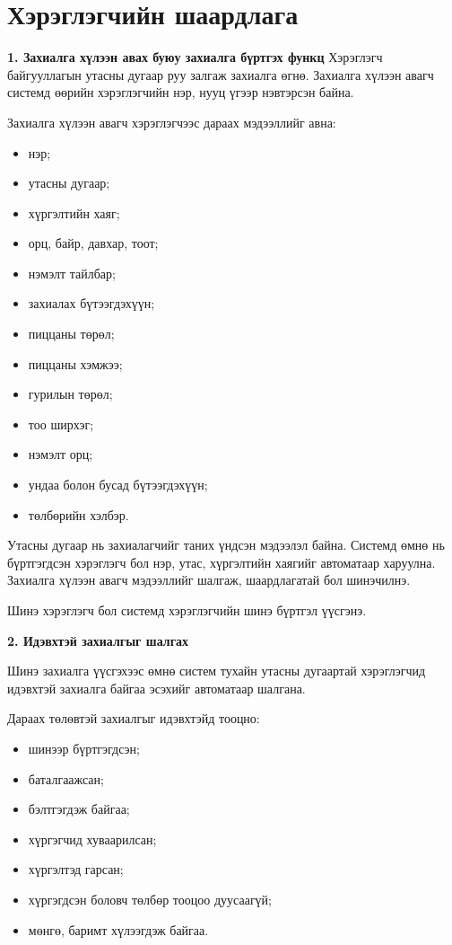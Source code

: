 \section{Хэрэглэгчийн шаардлага}

\textbf{1. Захиалга хүлээн авах буюу захиалга бүртгэх функц}
Хэрэглэгч байгууллагын утасны дугаар руу залгаж захиалга өгнө. Захиалга хүлээн авагч системд өөрийн хэрэглэгчийн нэр, нууц үгээр нэвтэрсэн байна.

Захиалга хүлээн авагч хэрэглэгчээс дараах мэдээллийг авна:
\begin{itemize}
    \item нэр;
    \item утасны дугаар;
    \item хүргэлтийн хаяг;
    \item орц, байр, давхар, тоот;
    \item нэмэлт тайлбар;
    \item захиалах бүтээгдэхүүн;
    \item пиццаны төрөл;
    \item пиццаны хэмжээ;
    \item гурилын төрөл;
    \item тоо ширхэг;
    \item нэмэлт орц;
    \item ундаа болон бусад бүтээгдэхүүн;
    \item төлбөрийн хэлбэр.
\end{itemize}

Утасны дугаар нь захиалагчийг таних үндсэн мэдээлэл байна. Системд өмнө нь бүртгэгдсэн хэрэглэгч бол нэр, утас, хүргэлтийн хаягийг автоматаар харуулна. Захиалга хүлээн авагч мэдээллийг шалгаж, шаардлагатай бол шинэчилнэ.

Шинэ хэрэглэгч бол системд хэрэглэгчийн шинэ бүртгэл үүсгэнэ.

\textbf{2. Идэвхтэй захиалгыг шалгах}

Шинэ захиалга үүсгэхээс өмнө систем тухайн утасны дугаартай хэрэглэгчид идэвхтэй захиалга байгаа эсэхийг автоматаар шалгана.

Дараах төлөвтэй захиалгыг идэвхтэйд тооцно:

\begin{itemize}
    \item шинээр бүртгэгдсэн;
    \item баталгаажсан;
    \item бэлтгэгдэж байгаа;
    \item хүргэгчид хуваарилсан;
    \item хүргэлтэд гарсан;
    \item хүргэгдсэн боловч төлбөр тооцоо дуусаагүй;
    \item мөнгө, баримт хүлээгдэж байгаа.
\end{itemize}

